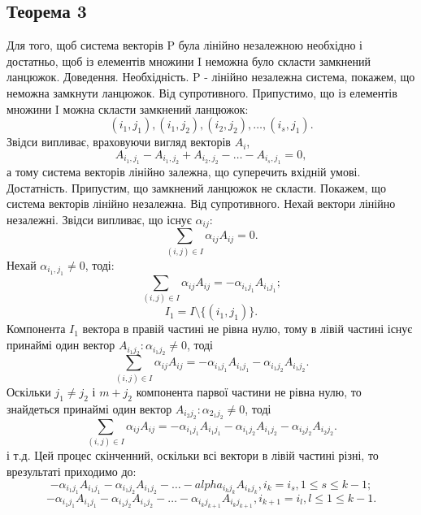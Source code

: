 \documentclass[12pt]{book}
\begin{document}
\subsection{Теорема 3}
Для того, щоб система векторів P була лінійно незалежною необхідно і достатньо, щоб із елементів множини I неможна було скласти замкнений ланцюжок.
Доведення.
Необхідність. P - лінійно незалежна система, покажем, що неможна замкнути ланцюжок. Від супротивного. Припустимо, що із елементів множини I можна скласти замкнений ланцюжок: $$(i_1,j_1), (i_1,j_2), (i_2,j_2), \dots, (i_s,j_1).$$ Звідси випливає, враховуючи вигляд векторів $A_i$, $$A_{{i_1},{j_1}}-A_{{i_1},{j_2}}+A_{{i_2},{j_2}}-\dots-A_{{i_s},{j_1}}=0,$$ а тому система векторів лінійно залежна, що суперечить вхідній умові.
Достатність. Припустим, що замкнений ланцюжок не скласти. Покажем, що система векторів лінійно незалежна. Від супротивного. Нехай вектори лінійно незалежні. Звідси випливає, що існує $\alpha_{ij}:$ $$\sum_{(i,j){\in}I}\alpha_{ij}A_{ij} = 0.$$
Нехай $\alpha_{{i_1},{j_1}} \neq 0$, тоді: $$\sum_{(i,j) \in I}\alpha_{ij}A_{ij} = -\alpha_{{i_1}{j_1}}A_{{i_1}{j_1}};$$$$I_1 = I\setminus\{(i_1,j_1)\}.$$
Компонента $I_1$ вектора в правій частині не рівна нулю, тому в лівій частині існує принаймі один вектор $A_{{i_1}{j_2}}: \alpha_{{i_1}{j_2}}\neq0$, тоді $$\sum_{(i,j){\in}I}\alpha_{ij}A_{ij} = -\alpha_{{i_1}{j_1}}A_{{i_1}{j_1}}-\alpha_{{i_1}{j_2}}A_{{i_1}{j_2}}.$$
Оскільки $j_1 \neq j_2$ і $m + j_2$ компонента парвої частини не рівна нулю, то знайдеться принаймі один вектор $A_{{i_2}{j_2}}: \alpha_{{2_1}{j_2}}\neq0$, тоді $$\sum_{(i,j){\in}I}\alpha_{ij}A_{ij} = -\alpha_{{i_1}{j_1}}A_{{i_1}{j_1}}-\alpha_{{i_1}{j_2}}A_{{i_1}{j_2}}-\alpha_{{i_2}{j_2}}A_{{i_2}{j_2}}.$$
і т.д.
Цей процес скінченний, оскільки всі вектори в лівій частині різні, то врезультаті приходимо до: $$-\alpha_{{i_1}{j_1}}A_{{i_1}{j_1}}-\alpha_{{i_1}{j_2}}A_{{i_1}{j_2}}-\dots-alpha_{{i_k}{j_k}}A_{{i_k}{j_k}}, i_k=i_s, 1{\leq}s{\leq}k-1;$$$$- \alpha_{{i_1}{j_1}}A_{{i_1}{j_1}}-\alpha_{{i_1}{j_2}}A_{{i_1}{j_2}}-\dots-\alpha_{{i_k}{j_{k+1}}}A_{{i_k}{j_{k+1}}}, i_{k+1}=i_l, l{\leq}1{\leq}k-1.$$
\end{document}

